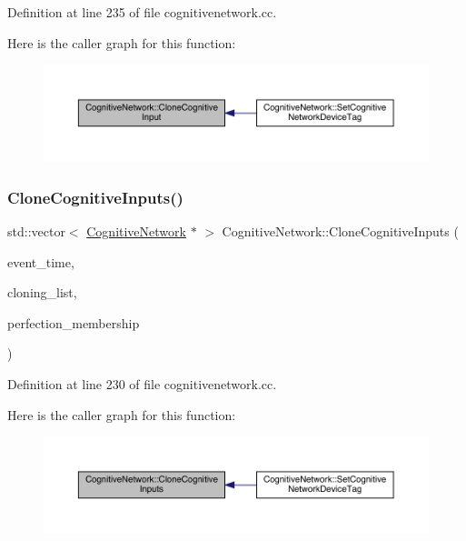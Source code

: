 Definition at line 235 of file cognitivenetwork.\+cc.

Here is the caller graph for this function\+:
\nopagebreak
\begin{figure}[H]
\begin{center}
\leavevmode
\includegraphics[width=350pt]{class_cognitive_network_a058cb2b044d56268e36f153fac21084e_icgraph}
\end{center}
\end{figure}
\mbox{\label{class_cognitive_network_aeaf2883b25dbf1eefd11c2d92efe8816}} 
\subsubsection{\texorpdfstring{Clone\+Cognitive\+Inputs()}{CloneCognitiveInputs()}}
{\footnotesize\ttfamily std\+::vector$<$ \hyperlink{class_cognitive_network}{Cognitive\+Network} $\ast$ $>$ Cognitive\+Network\+::\+Clone\+Cognitive\+Inputs (\begin{DoxyParamCaption}\item[{std\+::chrono\+::time\+\_\+point$<$ \hyperlink{universe_8h_a0ef8d951d1ca5ab3cfaf7ab4c7a6fd80}{Clock} $>$}]{event\+\_\+time,  }\item[{std\+::vector$<$ \hyperlink{class_cognitive_network}{Cognitive\+Network} $\ast$$>$}]{cloning\+\_\+list,  }\item[{double}]{perfection\+\_\+membership }\end{DoxyParamCaption})}



Definition at line 230 of file cognitivenetwork.\+cc.

Here is the caller graph for this function\+:
\nopagebreak
\begin{figure}[H]
\begin{center}
\leavevmode
\includegraphics[width=350pt]{class_cognitive_network_aeaf2883b25dbf1eefd11c2d92efe8816_icgraph}
\end{center}
\end{figure}
\mbox{\label{class_cognitive_network_ab24f74115c11275f365245a4bb826c91}} 
